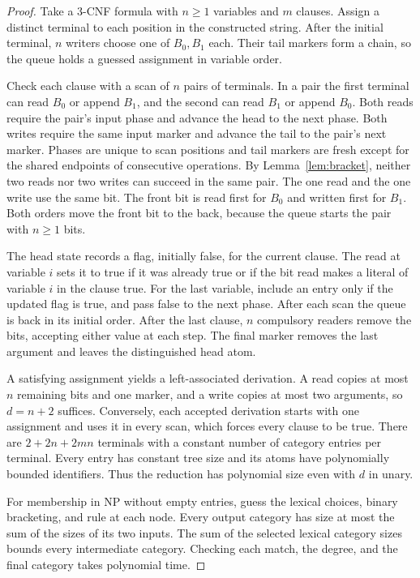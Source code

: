 \documentclass[11pt]{article}
\newcommand{\NP}{\mathrm{NP}}
\begin{document}
\begin{proof}
Take a 3-CNF formula with \(n\geq 1\) variables and \(m\) clauses. Assign a distinct terminal to each position in the constructed string. After the initial terminal, \(n\) writers choose one of \(B_0,B_1\) each. Their tail markers form a chain, so the queue holds a guessed assignment in variable order.

Check each clause with a scan of \(n\) pairs of terminals. In a pair the first terminal can read \(B_0\) or append \(B_1\), and the second can read \(B_1\) or append \(B_0\). Both reads require the pair's input phase and advance the head to the next phase. Both writes require the same input marker and advance the tail to the pair's next marker. Phases are unique to scan positions and tail markers are fresh except for the shared endpoints of consecutive operations. By Lemma~\ref{lem:bracket}, neither two reads nor two writes can succeed in the same pair. The one read and the one write use the same bit. The front bit is read first for \(B_0\) and written first for \(B_1\). Both orders move the front bit to the back, because the queue starts the pair with \(n\geq 1\) bits.

The head state records a flag, initially false, for the current clause. The read at variable \(i\) sets it to true if it was already true or if the bit read makes a literal of variable \(i\) in the clause true. For the last variable, include an entry only if the updated flag is true, and pass false to the next phase. After each scan the queue is back in its initial order. After the last clause, \(n\) compulsory readers remove the bits, accepting either value at each step. The final marker removes the last argument and leaves the distinguished head atom.

A satisfying assignment yields a left-associated derivation. A read copies at most \(n\) remaining bits and one marker, and a write copies at most two arguments, so \(d=n+2\) suffices. Conversely, each accepted derivation starts with one assignment and uses it in every scan, which forces every clause to be true. There are \(2+2n+2mn\) terminals with a constant number of category entries per terminal. Every entry has constant tree size and its atoms have polynomially bounded identifiers. Thus the reduction has polynomial size even with \(d\) in unary.

For membership in \(\NP\) without empty entries, guess the lexical choices, binary bracketing, and rule at each node. Every output category has size at most the sum of the sizes of its two inputs. The sum of the selected lexical category sizes bounds every intermediate category. Checking each match, the degree, and the final category takes polynomial time.
\end{proof}
\end{document}
